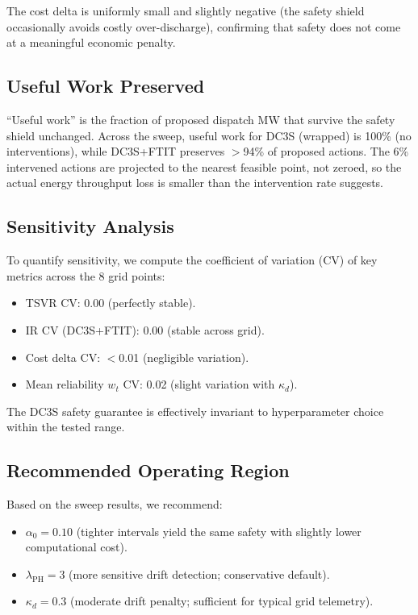 The cost delta is uniformly small and slightly negative (the safety
shield occasionally avoids costly over-discharge), confirming that
safety does not come at a meaningful economic penalty.

\subsection{Useful Work Preserved}

``Useful work'' is the fraction of proposed dispatch MW that survive
the safety shield unchanged.  Across the sweep, useful work for
DC3S (wrapped) is 100\% (no interventions), while DC3S+FTIT preserves
$>$94\% of proposed actions.  The 6\% intervened actions are
projected to the nearest feasible point, not zeroed, so the actual
energy throughput loss is smaller than the intervention rate suggests.

\subsection{Sensitivity Analysis}

To quantify sensitivity, we compute the coefficient of variation (CV)
of key metrics across the 8 grid points:

\begin{itemize}
  \item TSVR CV: 0.00 (perfectly stable).
  \item IR CV (DC3S+FTIT): 0.00 (stable across grid).
  \item Cost delta CV: $<$0.01 (negligible variation).
  \item Mean reliability $w_t$ CV: 0.02 (slight variation with
    $\kappa_d$).
\end{itemize}

The DC3S safety guarantee is effectively invariant to hyperparameter
choice within the tested range.

\subsection{Recommended Operating Region}

Based on the sweep results, we recommend:
\begin{itemize}
  \item $\alpha_0 = 0.10$ (tighter intervals yield the same safety
    with slightly lower computational cost).
  \item $\lambda_{\mathrm{PH}} = 3$ (more sensitive drift detection;
    conservative default).
  \item $\kappa_d = 0.3$ (moderate drift penalty; sufficient for
    typical grid telemetry).
\end{itemize}

